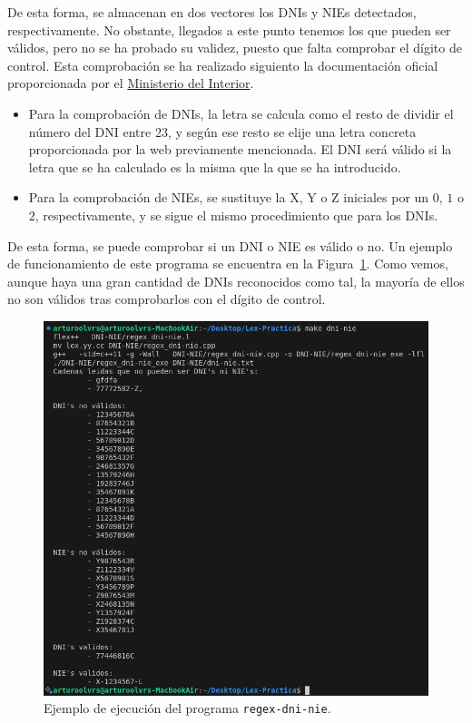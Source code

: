 \documentclass[12pt]{article}
\begin{document}
    De esta forma, se almacenan en dos vectores los DNIs y NIEs detectados, respectivamente. No obstante, llegados a este punto tenemos los que pueden ser válidos, pero no se ha probado su validez, puesto que falta comprobar el dígito de control. Esta comprobación se ha realizado siguiento la documentación oficial proporcionada por el \href{https://www.interior.gob.es/opencms/es/servicios-al-ciudadano/tramites-y-gestiones/dni/calculo-del-digito-de-control-del-nif-nie/}{Ministerio del Interior}.
    \begin{itemize}
        \item Para la comprobación de DNIs, la letra se calcula como el resto de dividir el número del DNI entre 23, y según ese resto se elije una letra concreta proporcionada por la web previamente mencionada. El DNI será válido si la letra que se ha calculado es la misma que la que se ha introducido.
        \item Para la comprobación de NIEs, se sustituye la X, Y o Z iniciales por un $0$, $1$ o $2$, respectivamente, y se sigue el mismo procedimiento que para los DNIs.
    \end{itemize}

    De esta forma, se puede comprobar si un DNI o NIE es válido o no. Un ejemplo de funcionamiento de este programa se encuentra en la Figura~\ref{fig:dni-nie}. Como vemos, aunque haya una gran cantidad de DNIs reconocidos como tal, la mayoría de ellos no son válidos tras comprobarlos con el dígito de control.
    \begin{figure}
        \centering
        \includegraphics[width=\textwidth]{Img/Funcionamiento_DNI-NIE.png}
        \caption{Ejemplo de ejecución del programa \texttt{regex-dni-nie}.}
        \label{fig:dni-nie}
    \end{figure}
\end{document}
